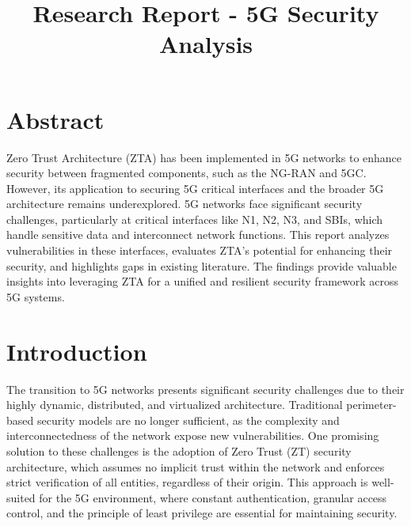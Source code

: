 \documentclass{report}
\title{Research Report - 5G Security Analysis} %
\begin{document}

\subject{Mobile and Wireless Networks} %




\buildmargins %
\buildcover %
\toc %


\section*{Abstract}
Zero Trust Architecture (ZTA) has been implemented in 5G networks to enhance security between fragmented components, such as the NG-RAN and 5GC. However, its application to securing 5G critical interfaces and the broader 5G architecture remains underexplored. 5G networks face significant security challenges, particularly at critical interfaces like N1, N2, N3, and SBIs, which handle sensitive data and interconnect network functions. This report analyzes vulnerabilities in these interfaces, evaluates ZTA’s potential for enhancing their security, and highlights gaps in existing literature. The findings provide valuable insights into leveraging ZTA for a unified and resilient security framework across 5G systems.

\section{Introduction}
The transition to 5G networks presents significant security challenges due to their highly dynamic, distributed, and virtualized architecture. Traditional perimeter-based security models are no longer sufficient, as the complexity and interconnectedness of the network expose new vulnerabilities. One promising solution to these challenges is the adoption of Zero Trust (ZT) security architecture, which assumes no implicit trust within the network and enforces strict verification of all entities, regardless of their origin. This approach is well-suited for the 5G environment, where constant authentication, granular access control, and the principle of least privilege are essential for maintaining security.
\end{document}
